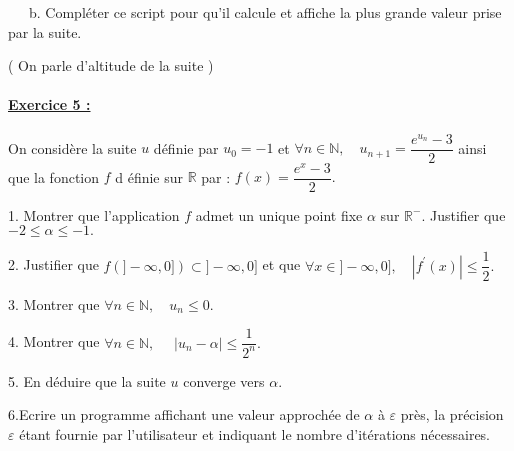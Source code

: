 \documentclass{article}
\begin{document}
\ \ \ b. Compl\'{e}ter ce script pour qu'il calcule et affiche la plus
grande valeur prise par la suite.

( On parle d'altitude de la suite )

\paragraph{\protect\underline{Exercice 5 :\thinspace }}

On consid\`{e}re la suite $u$ d\'{e}finie par $u_{0}=-1$ et $\forall n\in 
\mathbb{N},\quad u_{n+1}=\dfrac{e^{u_{n}}-3}{2}$ ainsi que la fonction $f$ d%
\'{e}finie sur $\mathbb{R}$ par : $f(x)=\dfrac{e^{x}-3}{2}.$

1. Montrer que l'application $f$ admet un unique point fixe $\alpha $ sur $%
\mathbb{R}
^{-}$. Justifier que $-2\leqslant \alpha \leqslant -1.$

2. Justifier que $f(]-\infty ,0])\subset ]-\infty ,0]$ et que $\forall x\in
]-\infty ,0],\quad \left\vert f^{\prime }(x)\right\vert \leqslant \dfrac{1}{2%
}.$

3. Montrer que $\forall n\in \mathbb{N},\quad u_{n}\leqslant 0.$

4. Montrer que $\forall n\in \mathbb{N},\quad $ $\left\vert u_{n}-\alpha
\right\vert \leqslant \dfrac{1}{2^{n}}.$

5. En d\'{e}duire que la suite $u$ converge vers $\alpha .$

6.Ecrire un programme affichant une valeur approch\'{e}e de $\alpha $ \`{a} $%
\varepsilon $ pr\`{e}s, la pr\'{e}cision $\varepsilon $ \'{e}tant fournie
par l'utilisateur et indiquant le nombre d'it\'{e}rations n\'{e}cessaires.

\bigskip

\bigskip
\end{document}
